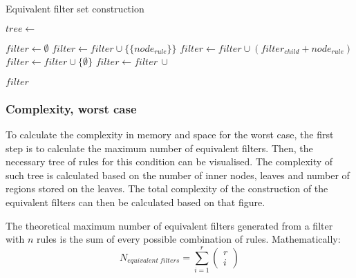 \begin{algorithm}
	\caption{\label{alg:filterEquivConstruct}Equivalent filter set construction}
	\begin{algorithmic}[1]
			\State $tree \gets $ 
			\State \Return {}
		\EndFunction
		\State

			\State $filter \gets \emptyset$
					\State $filter \gets filter \cup \{\{node_{rule}\}\}$
				\EndIf
			\Else{}
					\State $filter \gets filter \cup (filter_{child} + node_{rule})$
				\EndFor
			\EndIf
					\State $filter \gets filter \cup \{\emptyset\}$
				\EndIf
			\Else{}
				\State $filter \gets filter\, \cup $ 
			\EndIf

			\State \Return $filter$
		\EndFunction
	\end{algorithmic}
\end{algorithm}



\subsubsection{Complexity, worst case}

To calculate the complexity in memory and space for the worst case, the first
step is to calculate the maximum number of equivalent filters. Then, the
necessary tree of rules for this condition can be visualised. The complexity of
such tree is calculated based on the number of inner nodes, leaves and number of
regions stored on the leaves. The total complexity of the construction of the
equivalent filters can then be calculated based on that figure.

The theoretical maximum number of equivalent filters generated from a filter
with $n$ rules is the sum of every possible combination of rules.
Mathematically:
\begin{equation}
	N_{equivalent\ filters} = \sum_{i=1}^{r} \left( \begin{array}{l}r \\ i\end{array} \right)
\end{equation}

